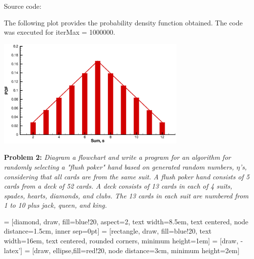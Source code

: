\documentclass[12pt]{article}
\begin{document}
Source code:


The following plot provides the probability density function obtained.
The code was executed for iterMax = 1000000.

\begin{center}
\includegraphics[width=0.7\textwidth]{plot1_bar.eps}
\end{center}

\textbf{Problem 2:}
\textit{Diagram a flowchart and write a program for an algorithm
for randomly selecting a "flush poker" hand based on generated random
numbers, $\eta$'s, considering that all cards are from the same suit. A
flush poker hand consists of 5 cards from a deck of 52 cards. A deck
consists of 13 cards in each of 4 suits, spades, hearts, diamonds, and
clubs. The 13 cards in each suit are numbered from 1 to 10 plus jack,
queen, and king.}

 = [diamond, draw, fill=blue!20, aspect=2,
    text width=8.5em, text centered, node distance=1.5cm, inner sep=0pt]
 = [rectangle, draw, fill=blue!20, 
    text width=16em, text centered, rounded corners, minimum height=1em]
 = [draw, -latex']
 = [draw, ellipse,fill=red!20, node distance=3cm,
    minimum height=2em]
\end{document}
